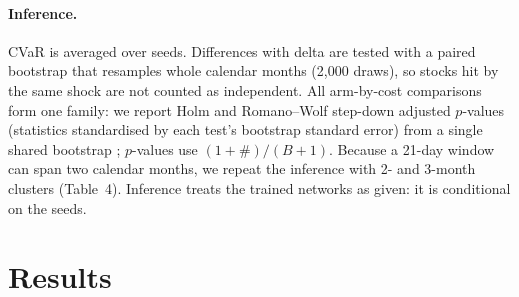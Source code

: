 \documentclass[11pt]{article}
\begin{document}
\paragraph{Inference.} CVaR is averaged over \NSeeds{} seeds. Differences with delta are tested with a
paired bootstrap that resamples whole calendar months (2{,}000 draws), so stocks hit by the same
shock are not counted as independent. All \NFamily{} arm-by-cost comparisons form one family:
we report Holm \citep{holm1979simple} and Romano--Wolf step-down \citep{romano2005stepwise}
adjusted $p$-values (statistics standardised by each test's bootstrap standard error) from a single
shared bootstrap \citep[see also][]{harvey2016and}; $p$-values use $(1+\#)/(B+1)$. Because a 21-day window
can span two calendar months, we repeat the inference with 2- and 3-month clusters (Table~4).
Inference treats the \NSeeds{} trained networks as given: it is conditional on the seeds.

\section{Results}
\begin{table}[h]\centering\small
\caption{CVaR$_{95}$ of hedging P\&L on the real test set (mean over \NSeeds{} seeds; lower is better).}

\end{table}

\begin{table}[h]\centering\small
\caption{CVaR difference vs BS delta at \FocusBps{} and 50 bps. Month-clustered 95\% CI; one-sided $p$-values,
raw and adjusted over all \NFamily{} comparisons. $^\dagger$post hoc.}

\end{table}

\begin{table}[h]\centering\small
\caption{Romano--Wolf adjusted $p$-values under 1-, 2- and 3-month bootstrap clusters
(rows with any $p<0.10$). The pre-registered choice is 1 month.}

\end{table}

\begin{table}[h]\centering\small
\caption{Economic size vs BS delta (average premium HK\$\AvgPremium{} per HK\$100).}
\resizebox{\textwidth}{!}{}
\end{table}


\end{document}
